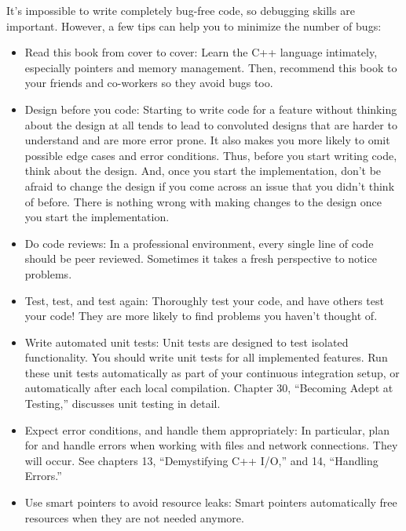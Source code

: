 It’s impossible to write completely bug-free code, so debugging skills are important. However, a few tips can help you to minimize the number of bugs:

\begin{itemize}
\item
Read this book from cover to cover: Learn the C++ language intimately, especially pointers and memory management. Then, recommend this book to your friends and co-workers so they avoid bugs too.

\item
Design before you code: Starting to write code for a feature without thinking about the design at all tends to lead to convoluted designs that are harder to understand and are more error prone. It also makes you more likely to omit possible edge cases and error conditions. Thus, before you start writing code, think about the design. And, once you start the implementation, don’t be afraid to change the design if you come across an issue that you didn’t think of before. There is nothing wrong with making changes to the design once you start the implementation.

\item
Do code reviews: In a professional environment, every single line of code should be peer reviewed. Sometimes it takes a fresh perspective to notice problems.

\item
Test, test, and test again: Thoroughly test your code, and have others test your code! They are more likely to find problems you haven’t thought of.

\item
Write automated unit tests: Unit tests are designed to test isolated functionality. You should write unit tests for all implemented features. Run these unit tests automatically as part of your continuous integration setup, or automatically after each local compilation. Chapter 30, “Becoming Adept at Testing,” discusses unit testing in detail.

\item
Expect error conditions, and handle them appropriately: In particular, plan for and handle errors when working with files and network connections. They will occur. See chapters 13, “Demystifying C++ I/O,” and 14, “Handling Errors.”

\item
Use smart pointers to avoid resource leaks: Smart pointers automatically free resources when they are not needed anymore.


\end{itemize}
